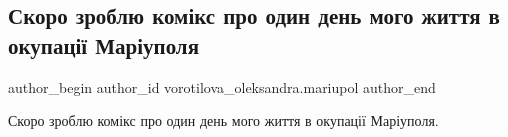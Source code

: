  
 
 
 
 

\subsection{Скоро зроблю комікс про один день мого життя в окупації Маріуполя}
\label{sec:10_06_2022.fb.vorotilova_oleksandra.mariupol.1.skoro_zroblyu_kom_ks}

\ifcmt
 author_begin
   author_id vorotilova_oleksandra.mariupol
 author_end
\fi

Скоро зроблю комікс про один день мого життя в окупації Маріуполя. 


